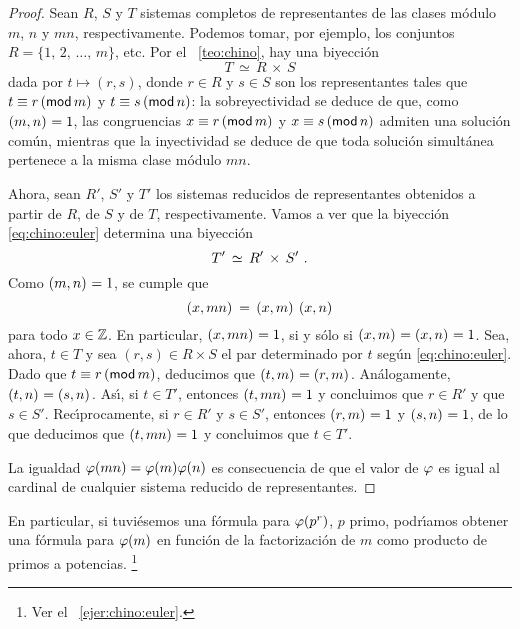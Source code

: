 \begin{proof}
	Sean $R$, $S$ y $T$ sistemas completos de representantes de las
	clases m\'odulo $m$, $n$ y $mn$, respectivamente.
	Podemos tomar, por ejemplo, los conjuntos $R=\{1,\,2,\,\dots,\,m\}$,
	etc.
	Por el \teoname~\ref{teo:chino}, hay una biyecci\'on
	\begin{equation}
		\label{eq:chino:euler}
		T\,\simeq\,R\,\times\,S
	\end{equation}
	dada por $t\mapsto (r,s)$, donde $r\in R$ y $s\in S$ son los
	representantes tales que $t\equiv r\tmodulo[m]$ y
	$t\equiv s\tmodulo[n]$: la sobreyectividad se deduce de que,
	como $\mcd{m,n}=1$, las congruencias
	$x\equiv r\tmodulo[m]$ y $x\equiv s\tmodulo[n]$ admiten una
	soluci\'on com\'un, mientras que la inyectividad se deduce de
	que toda soluci\'on simult\'anea pertenece a la misma clase
	m\'odulo $mn$.

	Ahora, sean $R'$, $S'$ y $T'$ los sistemas reducidos de
	representantes obtenidos a partir de $R$, de $S$ y de $T$,
	respectivamente.
	Vamos a ver que la biyecci\'on \eqref{eq:chino:euler} determina
	una biyecci\'on
	\begin{displaymath}
		T'\,\simeq\,R'\,\times\,S'
		\dispstop
	\end{displaymath}
	Como $\mcd{m,n}=1$, se cumple que
	\begin{equation}
		\label{eq:chino:euler:mcd}
		\mcd{x,mn}\,=\,\mcd{x,m}\,\mcd{x,n}
	\end{equation}
	para todo $x\in\Enteros$.
	En particular, $\mcd{x,mn}=1$, si y s\'olo si
	$\mcd{x,m}=\mcd{x,n}=1$.
	Sea, ahora, $t\in T$ y sea $(r,s)\in R\times S$ el par
	determinado por $t$ seg\'un \eqref{eq:chino:euler}.
	Dado que $t\equiv r\tmodulo[m]$, deducimos que
	$\mcd{t,m}=\mcd{r,m}$. An\'alogamente,
	$\mcd{t,n}=\mcd{s,n}$. As\'{\i}, si $t\in T'$, entonces
	$\mcd{t,mn}=1$ y concluimos que $r\in R'$ y que $s\in S'$.
	Rec\'{\i}procamente, si $r\in R'$ y $s\in S'$, entonces
	$\mcd{r,m}=1$ y $\mcd{s,n}=1$, de lo que deducimos que
	$\mcd{t,mn}=1$ y concluimos que $t\in T'$.

	La igualdad $\eulerphi(mn)=\eulerphi(m)\eulerphi(n)$ es
	consecuencia de que el valor de $\eulerphi$ es igual
	al cardinal de cualquier sistema reducido de representantes.
\end{proof}

En particular, si tuvi\'esemos una f\'ormula para $\eulerphi(p^r)$,
$p$ primo, podr\'{\i}amos obtener una f\'ormula para $\eulerphi(m)$
en funci\'on de la factorizaci\'on de $m$ como producto de primos
a potencias.%
\footnote{
	Ver el \ejername~\ref{ejer:chino:euler}.
}


